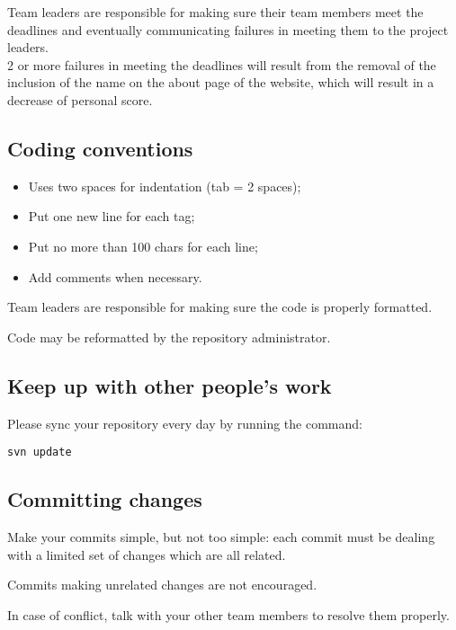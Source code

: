 \documentclass[hidelinks,12pt,a4paper,numbers=enddot]{scrartcl}
\begin{document}
Team leaders are responsible for making sure their team members
meet the deadlines and eventually communicating failures in meeting
them to the project leaders.\\

2 or more failures in meeting the deadlines will result from the removal
of the inclusion of the name on the about page of the website, which
will result in a decrease of personal score.

\subsection{Coding conventions}\label{coding-conventions}

\begin{itemize}
\item
  Uses two spaces for indentation (tab = 2 spaces);
\item
  Put one new line for each tag;
\item
  Put no more than 100 chars for each line;
\item
  Add comments when necessary.
\end{itemize}

Team leaders are responsible for making sure the code is properly
formatted.

Code may be reformatted by the repository administrator.

\subsection{Keep up with other people's work}\label{keep-up-with-other-peoples-work}

Please sync your repository every day by running the command:

\begin{verbatim}
svn update
\end{verbatim}

\subsection{Committing changes}\label{committing-changes}

Make your commits simple, but not too simple: each commit must be
dealing with a limited set of changes which are all related.

Commits making unrelated changes are not encouraged.

In case of conflict, talk with your other team members to resolve them
properly.
\end{document}
